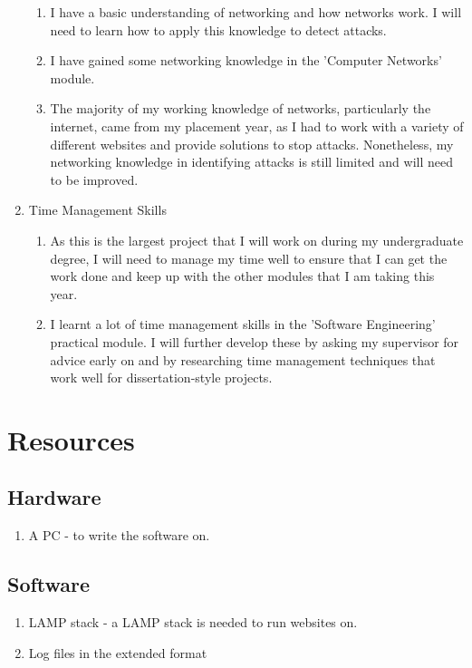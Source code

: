 \begin{enumerate}
\begin{enumerate}
    \item I have a basic understanding of networking and how networks work. I will need to learn how to apply this knowledge to detect attacks.
    \item I have gained some networking knowledge in the 'Computer Networks' module. 
    \item The majority of my working knowledge of networks, particularly the internet, came from my placement year, as I had to work with a variety of different websites and provide solutions to stop attacks. Nonetheless, my networking knowledge in identifying attacks is still limited and will need to be improved. 
\end{enumerate}
\item Time Management Skills
\begin{enumerate}
    \item As this is the largest project that I will work on during my undergraduate degree, I will need to manage my time well to ensure that I can get the work done and keep up with the other modules that I am taking this year. 
    \item I learnt a lot of time management skills in the 'Software Engineering' practical module. I will further develop these by asking my supervisor for advice early on and by researching time management techniques that work well for dissertation-style projects.
\end{enumerate}
\end{enumerate}

\section{Resources}

\subsection{Hardware}
\begin{enumerate}
    \item A PC - to write the software on.
\end{enumerate}
\subsection{Software}
\begin{enumerate}
    \item LAMP stack - a LAMP stack is needed to run websites on.
    \item Log files in the extended format
\end{enumerate}

